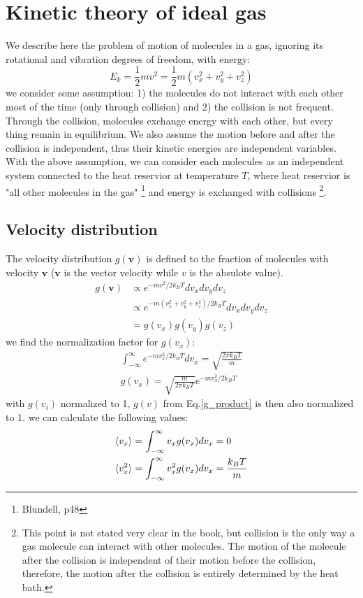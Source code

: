 \documentclass{article}
\begin{document}
\section{Kinetic theory of ideal gas}
We describe here the problem of motion of molecules in a gas, 
ignoring its rotational and vibration degrees of freedom, with 
energy: 
\begin{equation}
    E_k = \frac{1}{2}mv^2 = \frac{1}{2}m(v_x^2 + v_y^2 + v_z^2)
\end{equation}
we consider some assumption: 1) the molecules do not interact 
with each other most of the time (only through collision) and 2) the collision is 
not frequent. Through the collision, molecules exchange energy with each other,
but every thing remain in equilibrium. We also assume the motion before and 
after the collision is independent, thus their kinetic energies are 
independent variables. With the above assumption, we can consider 
each molecules as an independent system connected to the heat reservior at 
temperature $T$, where heat reservior is "all other molecules in the gas"
\footnote{Blundell, p48} and energy is exchanged with collisions
\footnote{This point
is not stated very clear in the book, but collision is the only way a gas molecule
can interact with other molecules. The motion of the molecule after the collision is
independent of their motion before the collision, therefore, the motion after the 
collision is entirely determined by the heat bath.}.

\subsection{Velocity distribution}
The velocity distribution $g(\mathbf{v})$ is defined to the fraction of molecules with 
velocity $\mathbf{v}$ 
($\mathbf{v}$ is the vector velocity while $v$ is the absulote value). 
\begin{align}
    g(\mathbf{v}) &\propto e^{-mv^2/2k_BT} dv_xdv_ydv_z \\
    &\propto e^{-m(v_x^2 + v_y^2 + v_z^2)/2k_BT} dv_xdv_ydv_z \\
    &= g(v_x)g(v_y)g(v_z) \label{g_product}
\end{align} 
we find the normalization factor for $g(v_x)$:
\begin{gather}
    \int_{-\infty}^{\infty} e^{-mv_x^2/2k_BT} dv_x = \sqrt{\frac{2\pi k_BT}{m}} \\
    g(v_x) = \sqrt{\frac{m}{2\pi k_BT}} e^{-mv_x^2/2k_BT}
\end{gather}
with $g(v_i)$ normalized to 1, $g(v)$ from Eq.\ref{g_product} is then also normalized to 1.
we can calculate the following values:
\begin{align}
    \langle v_x \rangle &= \int_{-\infty}^{\infty} v_x g(v_x) dv_x = 0 \notag \\
    \langle v_x^2 \rangle &= \int_{-\infty}^{\infty} v_x^2 g(v_x) dv_x = \frac{k_BT}{m} \notag 
\end{align}
\end{document}
